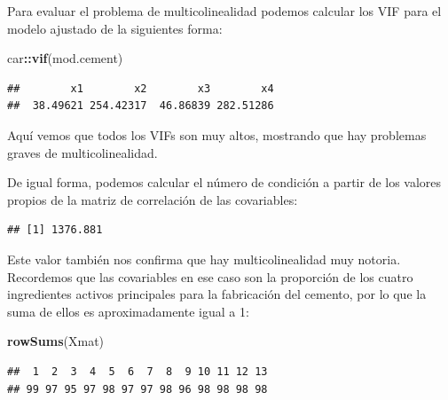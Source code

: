 \documentclass[
]{article}
\newenvironment{Shaded}{\begin{snugshade}}{\end{snugshade}}
\newcommand{\DecValTok}[1]{\textcolor[rgb]{0.00,0.00,0.81}{#1}}
\newcommand{\FunctionTok}[1]{\textcolor[rgb]{0.13,0.29,0.53}{\textbf{#1}}}
\newcommand{\NormalTok}[1]{#1}
\newcommand{\OtherTok}[1]{\textcolor[rgb]{0.56,0.35,0.01}{#1}}
\newcommand{\SpecialCharTok}[1]{\textcolor[rgb]{0.81,0.36,0.00}{\textbf{#1}}}
\begin{document}
Para evaluar el problema de multicolinealidad podemos calcular los VIF para el modelo ajustado de la siguientes forma:

\begin{Shaded}
\begin{Highlighting}[]
\NormalTok{car}\SpecialCharTok{::}\FunctionTok{vif}\NormalTok{(mod.cement)}
\end{Highlighting}
\end{Shaded}

\begin{verbatim}
##        x1        x2        x3        x4 
##  38.49621 254.42317  46.86839 282.51286
\end{verbatim}

Aquí vemos que todos los VIFs son muy altos, mostrando que hay problemas graves de multicolinealidad.

De igual forma, podemos calcular el número de condición a partir de los valores propios de la matriz de correlación de las covariables:

\begin{Shaded}
\end{Shaded}

\begin{verbatim}
## [1] 1376.881
\end{verbatim}

Este valor también nos confirma que hay multicolinealidad muy notoria. Recordemos que las covariables en ese caso son la proporción de los cuatro ingredientes activos principales para la fabricación del cemento, por lo que la suma de ellos es aproximadamente igual a 1:

\begin{Shaded}
\begin{Highlighting}[]
\FunctionTok{rowSums}\NormalTok{(Xmat)}
\end{Highlighting}
\end{Shaded}

\begin{verbatim}
##  1  2  3  4  5  6  7  8  9 10 11 12 13 
## 99 97 95 97 98 97 97 98 96 98 98 98 98
\end{verbatim}
\end{document}
